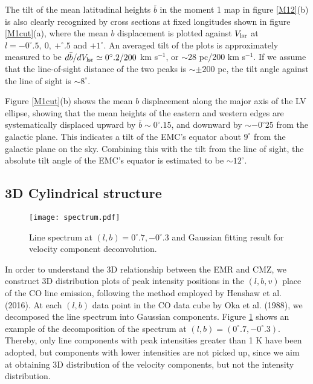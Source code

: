 \documentclass[useAMS,usenatbib]{mn2e}
\def\kms{km s$^{-1}$}
\def\vlsr{V_{\rm lsr}}
\def\deg{^\circ}\def\Deg{^\circ}
\begin{document}
 The tilt of the mean latitudinal heights ${\bar b}$ in the moment 1 map in figure \ref{M12}(b) is also clearly recognized by cross sections at fixed longitudes shown in figure \ref{M1cut}(a), where the mean $b$ displacement is plotted against $\vlsr$ at $l=-0\deg.5,\ 0,\ +\deg.5$ and $+1\deg$. An averaged tilt of the plots is approximately measured to be $d{\bar b} /d\vlsr \simeq 0\deg.2/200$ \kms, or $\sim 28$ pc/200 \kms. If we assume that the line-of-sight distance of the two peaks is $\sim \pm 200$ pc, the tilt angle against the line of sight is $\sim 8\deg$.
 
 Figure \ref{M1cut}(b) shows the mean $b$ displacement along the major axis of the LV ellipse, showing that the mean heights of the eastern and western edges are systematically displaced upward by ${\bar b} \sim 0\deg.15$, and downward by $\sim -0\deg25$ from the galactic plane. This indicates a tilt of the EMC's equator about $9\deg$ from the galactic plane on the sky. Combining this with the tilt from the line of sight, the absolute tilt angle of the EMC's equator is estimated to be $\sim 12\deg$.


\subsection{3D Cylindrical structure}  

\begin{figure} 
\begin{center}  
\texttt{[image: spectrum.pdf]} 
\end{center}
\caption{Line spectrum at $(l,b)=0\deg.7, -0\deg.3$ and Gaussian fitting result for velocity component deconvolution. }
 \label{spec}  
\end{figure}  

In order to understand the 3D relationship between the EMR and CMZ, we construct 3D distribution plots of peak intensity positions in the $(l,b,v)$ place of the CO line emission, following the method employed by Henshaw et al. (2016).
At each $(l,b)$ data point in the CO data cube by Oka et al. (1988), we decomposed the line spectrum into Gaussian components. 
Figure \ref{spec} shows an example of the decomposition of the spectrum at $(l,b)=(0\deg.7, -0\deg.3)$. Thereby, only line components with peak intensities greater than 1 K have been adopted, but components with lower intensities are not picked up, since we aim at obtaining 3D distribution of the velocity components, but not the intensity distribution. 
\end{document}
